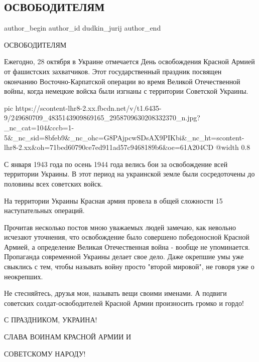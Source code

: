  
 
 
 
 
 
\subsection{ОСВОБОДИТЕЛЯМ}
\label{sec:28_10_2021.fb.dudkin_jurij.3.osvoboditeljam}
 
\ifcmt
 author_begin
   author_id dudkin_jurij
 author_end
\fi

ОСВОБОДИТЕЛЯМ

Ежегодно, 28 октября в Украине отмечается День освобождения Красной Армией от
фашистских захватчиков. Этот государственный праздник посвящен окончанию
Восточно-Карпатской операции во время Великой Отечественной войны, когда
немецкие войска были изгнаны с территории Советской Украины.

\ifcmt
  pic https://scontent-lhr8-2.xx.fbcdn.net/v/t1.6435-9/249680709_4835143909869165_2958709630208332370_n.jpg?_nc_cat=104&ccb=1-5&_nc_sid=8bfeb9&_nc_ohc=G8PAjpcwSDsAX9PIKbi&_nc_ht=scontent-lhr8-2.xx&oh=71bed60790ce7ed911ad57c9468189b6&oe=61A204CD
  @width 0.8
\fi

С января 1943 года по осень 1944 года велись бои за освобождение всей
территории Украины. В этот период на украинской земле были сосредоточены до
половины всех советских войск.

На территории Украины Красная армия провела в общей сложности 15 наступательных
операций.

Прочитав несколько постов мною уважаемых людей замечаю, как невольно исчезают
уточнения, что освобождение было совершено победоносной Красной Армией, а
определение Великая Отечественная война - вообще не упоминается. Пропаганда
современной Украины делает свое дело. Даже окрепшие умы уже свыклись с тем,
чтобы называть войну просто "второй мировой", не говоря уже о неокрепших.

Не стесняйтесь, друзья мои, называть вещи своими именами. А подвиги советских
солдат-освободителей Красной Армии произносить громко и гордо!

С ПРАЗДНИКОМ, УКРАИНА!

СЛАВА ВОИНАМ КРАСНОЙ АРМИИ И

СОВЕТСКОМУ НАРОДУ!

